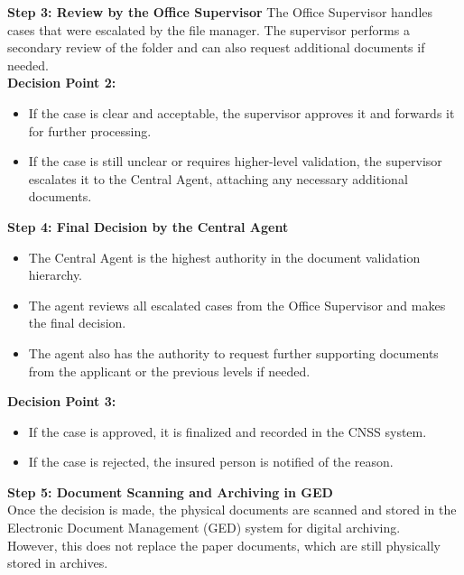 \textbf{ Step 3: Review by the Office Supervisor}
The Office Supervisor handles cases that were escalated by the file manager.
The supervisor performs a secondary review of the folder and can also request additional documents if needed.\\
\textbf{Decision Point 2:}
\begin{itemize}
    \item If the case is clear and acceptable, the supervisor approves it and forwards it for further processing.
    \item If the case is still unclear or requires higher-level validation, the supervisor escalates it to the Central Agent, attaching any necessary additional documents.
\end{itemize}
 \textbf{ Step 4: Final Decision by the Central Agent}
\begin{itemize}
    \item The Central Agent is the highest authority in the document validation hierarchy.
    \item The agent reviews all escalated cases from the Office Supervisor and makes the final decision.
    \item The agent also has the authority to request further supporting documents from the applicant or the previous levels if needed.
\end{itemize}
\textbf{Decision Point 3:}
\begin{itemize}
    \item If the case is approved, it is finalized and recorded in the CNSS system.
    \item If the case is rejected, the insured person is notified of the reason.
\end{itemize}

\textbf{ Step 5: Document Scanning and Archiving in GED}\\
Once the decision is made, the physical documents are scanned and stored in the Electronic Document Management (GED) system for digital archiving.\\
However, this does not replace the paper documents, which are still physically stored in archives.

